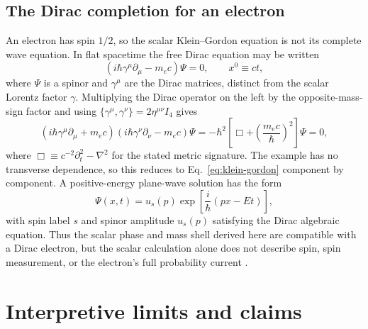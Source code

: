 \documentclass[12pt]{article}
\begin{document}
\subsection{The Dirac completion for an electron}

An electron has spin $1/2$, so the scalar Klein--Gordon equation is not its complete wave equation. In flat spacetime the free Dirac equation may be written
\begin{equation}
  \left(i\hbar\gamma^\mu\partial_\mu-m_ec\right)\Psi=0,
  \qquad x^0\equiv ct,
  \label{eq:dirac-equation}
\end{equation}
where $\Psi$ is a spinor and $\gamma^\mu$ are the Dirac matrices, distinct from the scalar Lorentz factor $\gamma$. Multiplying the Dirac operator on the left by the opposite-mass-sign factor and using $\{\gamma^\mu,\gamma^\nu\}=2\eta^{\mu\nu}I_4$ gives
\begin{equation}
  \left(i\hbar\gamma^\mu\partial_\mu+m_ec\right)
  \left(i\hbar\gamma^\nu\partial_\nu-m_ec\right)\Psi
  =-\hbar^2\left[\Box+\left(\frac{m_ec}{\hbar}\right)^2\right]\Psi=0,
  \label{eq:dirac-factorization}
\end{equation}
where $\Box\equiv c^{-2}\partial_t^2-\nabla^2$ for the stated metric signature. The example has no transverse dependence, so this reduces to Eq.~\eqref{eq:klein-gordon} component by component. A positive-energy plane-wave solution has the form
\begin{equation}
  \Psi(x,t)=u_s(p)\exp\!\left[\frac{i}{\hbar}(px-Et)\right],
  \label{eq:dirac-plane-wave}
\end{equation}
with spin label $s$ and spinor amplitude $u_s(p)$ satisfying the Dirac algebraic equation. Thus the scalar phase and mass shell derived here are compatible with a Dirac electron, but the scalar calculation alone does not describe spin, spin measurement, or the electron's full probability current \cite{Dirac1928}.

\section{Interpretive limits and claims}
\end{document}
